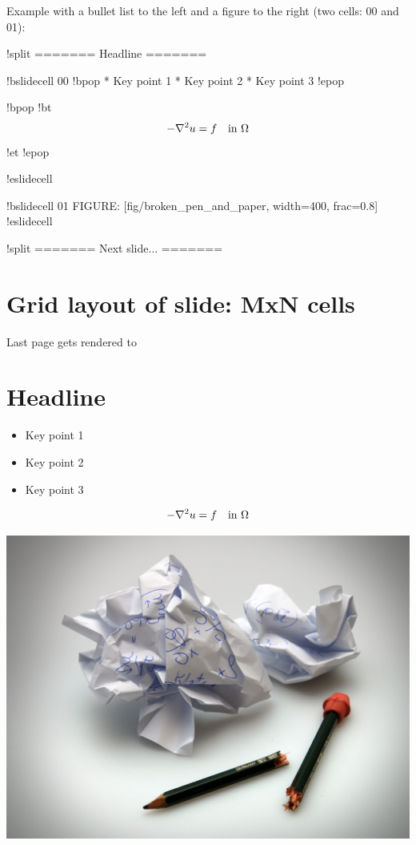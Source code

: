 \documentclass[%
twoside,                 %
draft,                   %
final,                   %
chapterprefix=true,      %
open=right               %
10pt]{book}
\begin{document}
\begin{shadedquoteBlue}
Example with a bullet list to the left and
a figure to the right (two cells: 00 and 01):

\bccq
!split
======= Headline =======

!bslidecell 00
!bpop
 * Key point 1
 * Key point 2
 * Key point 3
!epop

!bpop
!bt
\[ -\nabla^2 u = f \quad\hbox{in }\Omega \]
!et
!epop

!eslidecell

!bslidecell 01
FIGURE: [fig/broken_pen_and_paper, width=400, frac=0.8]
!eslidecell

!split
======= Next slide... =======
\eccq

\section*{Grid layout of slide: MxN cells}

Last page gets rendered to




\section*{Headline}

\begin{itemize}
 \item Key point 1

 \item Key point 2

 \item Key point 3
\end{itemize}

\noindent

\[ -\nabla^2 u = f \quad\hbox{in }\Omega \]



\begin{center}  %
  \centerline{\includegraphics[width=0.9\linewidth]{fig/broken_pen_and_paper.jpg}}
\end{center}


\end{shadedquoteBlue}
\end{document}
